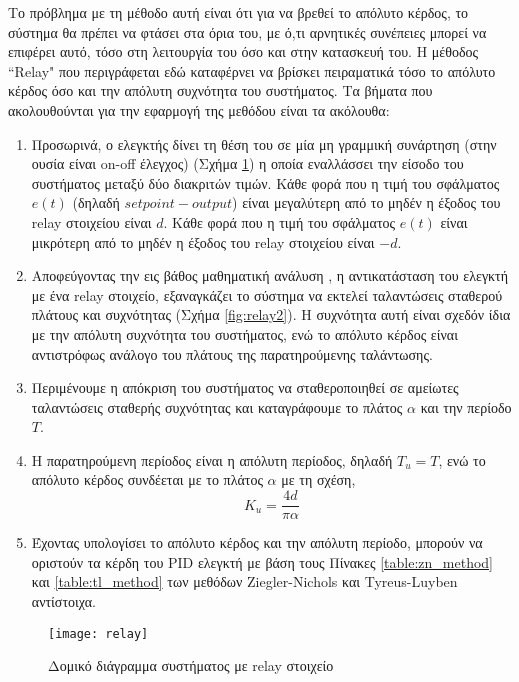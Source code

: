 Το πρόβλημα με τη μέθοδο αυτή είναι ότι για να βρεθεί το απόλυτο κέρδος, το σύστημα θα πρέπει να φτάσει στα όρια του, με ό,τι αρνητικές συνέπειες μπορεί να επιφέρει αυτό, τόσο στη λειτουργία του όσο και στην κατασκευή του. Η μέθοδος ``Relay" που περιγράφεται εδώ καταφέρνει να βρίσκει πειραματικά τόσο το απόλυτο κέρδος όσο και την απόλυτη συχνότητα του συστήματος. Τα βήματα που ακολουθούνται για την εφαρμογή της μεθόδου είναι τα ακόλουθα:
\begin{enumerate}

\item Προσωρινά, ο ελεγκτής δίνει τη θέση του σε μία μη γραμμική συνάρτηση (στην ουσία είναι on-off	έλεγχος) (Σχήμα \ref{fig:relay}) η οποία εναλλάσσει την είσοδο του συστήματος μεταξύ δύο διακριτών τιμών. Κάθε φορά που η τιμή του σφάλματος $e(t)$ (δηλαδή $setpoint - output$) είναι μεγαλύτερη από το μηδέν η έξοδος του relay στοιχείου είναι $d$. Κάθε φορά που η τιμή του σφάλματος $e(t)$ είναι μικρότερη από το μηδέν η έξοδος του relay στοιχείου είναι $-d$.

\item Αποφεύγοντας την εις βάθος μαθηματική ανάλυση \cite{astrom}, η αντικατάσταση του ελεγκτή με ένα relay στοιχείο, εξαναγκάζει το σύστημα να εκτελεί ταλαντώσεις σταθερού πλάτους και συχνότητας (Σχήμα \ref{fig:relay2}). Η συχνότητα αυτή είναι σχεδόν ίδια με την απόλυτη συχνότητα του συστήματος, ενώ το απόλυτο κέρδος είναι αντιστρόφως ανάλογο του πλάτους της παρατηρούμενης ταλάντωσης.

\item Περιμένουμε η απόκριση του συστήματος να σταθεροποιηθεί σε αμείωτες ταλαντώσεις σταθερής συχνότητας και καταγράφουμε το πλάτος $\alpha$ και την περίοδο $T$.
 
\item Η παρατηρούμενη περίοδος είναι η απόλυτη περίοδος, δηλαδή $T_u=T$, ενώ το απόλυτο κέρδος συνδέεται με το πλάτος $\alpha$ με τη σχέση,
\begin{equation}
K_u = \frac{4d}{\pi\alpha}
\end{equation}

\item Έχοντας υπολογίσει το απόλυτο κέρδος και την απόλυτη περίοδο, μπορούν να οριστούν τα κέρδη του PID ελεγκτή με βάση τους Πίνακες \ref{table:zn_method} και \ref{table:tl_method} των μεθόδων Ziegler-Nichols και Tyreus-Luyben αντίστοιχα.

\end{enumerate}

\begin{figure}[h]
  \centering
  \texttt{[image: relay]}
  \caption{Δομικό διάγραμμα συστήματος με relay στοιχείο}
  \label{fig:relay}
\end{figure}



